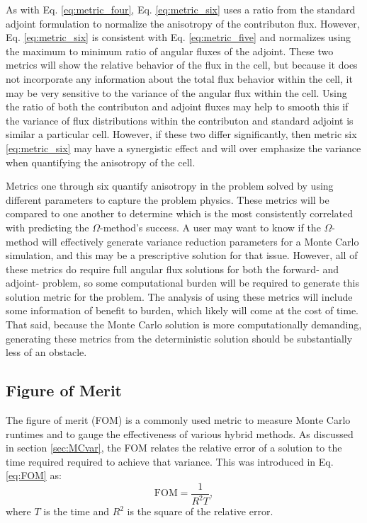 As with Eq. \ref{eq:metric_four}, Eq. \ref{eq:metric_six} uses a ratio from
the standard adjoint formulation to normalize the anisotropy of the
contributon flux. However, Eq. \ref{eq:metric_six} is consistent with Eq.
\eqref{eq:metric_five} and normalizes using the maximum to minimum
ratio of angular fluxes of the adjoint. These two
metrics will show the relative behavior of the flux in the cell, but because it
does not incorporate any information about the total flux behavior within the
cell, it may be very sensitive to the variance of the angular flux within the
cell. Using the ratio of both the contributon and adjoint fluxes may
help to smooth this if the variance of flux distributions within the contributon
and standard adjoint is similar a particular cell. However, if these two
differ significantly, then metric six \eqref{eq:metric_six} may have a
synergistic effect
and will over emphasize the variance when quantifying the anisotropy of the
cell.

Metrics one through six quantify anisotropy
in the problem solved by using different parameters to capture the problem
physics. These metrics will be compared to one another to determine which is the
most consistently correlated with predicting the $\Omega$-method's success. A
user may want to know if the $\Omega$-method will effectively generate variance
reduction parameters for a Monte Carlo simulation, and this may be a
prescriptive solution for that issue. However, all of these metrics do require
full angular flux solutions for both the forward- and adjoint- problem, so some
computational burden will be required to generate this solution metric for the
problem. The analysis of using these metrics will include some information of
benefit to burden, which likely will come at the cost of time.
That said, because the Monte Carlo solution is more computationally
demanding, generating these metrics from the deterministic solution should be
substantially less of an obstacle.

\subsection{Figure of Merit}

The figure of merit (FOM) is a commonly used metric to measure Monte Carlo
runtimes and to gauge the effectiveness of various hybrid methods. As discussed
in section \ref{sec:MCvar}, the FOM relates the relative error of a solution to the
time required required to achieve that variance. This was introduced in Eq.
\ref{eq:FOM} as:
\begin{equation*}
  \text{FOM} = \frac{1}{R^{2}T} ,
\end{equation*}
where $T$ is the time and $R^{2}$ is the square of the relative error.

